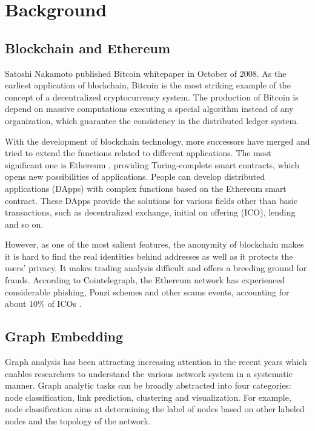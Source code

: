
\section{Background}
\subsection{Blockchain and Ethereum}
Satoshi Nakamoto published Bitcoin whitepaper \cite{Nakamoto2008} in October of 2008. As the earliest application of blockchain, Bitcoin is the most striking example of the concept of a decentralized cryptocurrency system. The production of Bitcoin is depend on massive computations executing a special algorithm instead of any organization, which guarantee the consistency in the distributed ledger system.

With the development of blockchain technology, more successors have merged and tried to extend the functions related to different applications. The most significant one is Ethereum \cite{buterin2013ethereum}, providing Turing-complete smart contracts, which opens new possibilities of applications. People can develop distributed applications (DApps) with complex functions based on the Ethereum smart contract. These DApps provide the solutions for various fields other than basic transactions, such as decentralized exchange, initial on offering (ICO), lending and so on.

However, as one of the most salient features, the anonymity of blockchain makes it is hard to find the real identities behind addresses as well as it protects the users' privacy. It makes trading analysis difficult and offers a breeding ground for frauds. According to Cointelegraph, the Ethereum network has experienced considerable phishing, Ponzi schemes and other scams events, accounting for about 10\% of ICOs \cite{cerchiello2018icos}.
\subsection{Graph Embedding}
Graph analysis has been attracting increasing attention in the recent years which enables researchers to understand the various network system in a systematic manner. Graph analytic tasks can be broadly abstracted into four categories: node classification\cite{bhagat2011node}, link prediction\cite{liben2007link}, clustering\cite{ding2001min} and visualization\cite{maaten2008visualizing}. For example, node classification aims at determining the label of nodes based on other labeled nodes and the topology of the network.

